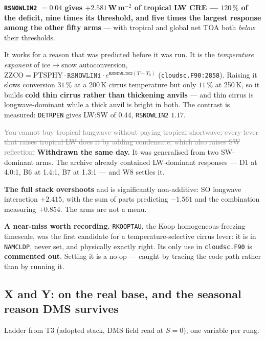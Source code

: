 \documentclass[10pt]{article}
\newcommand{\dead}[1]{\textcolor{gray}{\sout{#1}}}
\begin{document}
\noindent \textbf{\texttt{RSNOWLIN2} $=0.04$ gives $+2.581$\,W\,m$^{-2}$ of tropical LW
CRE --- $120\,\%$ of the deficit, nine times its threshold, and five times the largest
response among the other fifty arms} --- with tropical and global net TOA both
\emph{below} their thresholds.

It works for a reason that was predicted before it was run. It is the \emph{temperature
exponent} of ice$\to$snow autoconversion,
$\mathrm{ZZCO}=\mathrm{PTSPHY}\cdot\mathtt{RSNOWLIN1}\cdot e^{\mathtt{RSNOWLIN2}(T-T_0)}$
(\texttt{cloudsc.F90:2858}). Raising it slows conversion $31\,\%$ at a 200\,K cirrus
temperature but only $11\,\%$ at 250\,K, so it builds \textbf{cold thin cirrus rather than
thickening anvils} --- and thin cirrus is longwave-dominant while a thick anvil is bright
in both. The contrast is measured: \texttt{DETRPEN} gives LW:SW of $0.44$, \texttt{RSNOWLIN2}
$1.17$.

\dead{You cannot buy tropical longwave without paying tropical shortwave; every lever that
raises tropical LW does it by adding condensate, which also raises SW reflection.}
\textbf{Withdrawn the same day.} It was generalised from two SW-dominant arms. The archive
already contained LW-dominant responses --- D1 at 4.0:1, B6 at 1.4:1, B7 at 1.3:1 --- and
W8 settles it.

\textbf{The full stack overshoots} and is significantly non-additive: SO longwave
interaction $+2.415$, with the sum of parts predicting $-1.561$ and the combination
measuring $+0.854$. The arms are not a menu.

\textbf{A near-miss worth recording.} \texttt{RKOOPTAU}, the Koop homogeneous-freezing
timescale, was the first candidate for a temperature-selective cirrus lever: it is in
\texttt{NAMCLDP}, never set, and physically exactly right. Its only use in
\texttt{cloudsc.F90} is \textbf{commented out}. Setting it is a no-op --- caught by
tracing the code path rather than by running it.

\subsection{X and Y: on the real base, and the seasonal reason DMS survives}\label{sub:r27x}
Ladder from T3 (adopted stack, DMS field read at $S=0$), one variable per rung.
\end{document}
